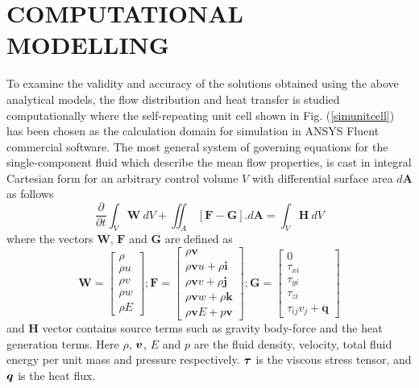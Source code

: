\documentclass[twocolumn,10pt,cleanfoot]{ihmtc}
\begin{document}
\section{COMPUTATIONAL MODELLING}\label{compmodel}
To examine the validity and accuracy of the solutions obtained using the above analytical models, the flow distribution and heat transfer is studied computationally where the self-repeating unit cell shown in Fig. (\ref{simunitcell}) has been chosen as the calculation domain for simulation in ANSYS Fluent commercial software. The most general system of governing equations for the single-component fluid which describe the mean flow properties, is cast in integral Cartesian form for an arbitrary control volume $V$ with differential surface area $d\boldsymbol{A}$ \cite{fluent} as follows
%
\begin{equation*}
\frac{\partial}{\partial t}\int_{V}\boldsymbol{W\:}dV+\iint_{A}\,[\mathbf{F}-\mathbf{G}].d\boldsymbol{A}=\int_{V}\boldsymbol{H\:}dV 
\end{equation*}
%
where the vectors $\boldsymbol{W}$, $\mathbf{F}$ and $\mathbf{G}$ are defined as 
%
\begin{equation*}
 \boldsymbol{W}=\left[\begin{array}{c} \rho\\ \rho u\\ \rho v\\ \rho w\\ \rho E \end{array}\right] ; \boldsymbol{\mathbf{F}}=\left[\begin{array}{c} \rho\boldsymbol{v}\\ \rho\boldsymbol{v}u+\rho\boldsymbol{i}\\ \rho\boldsymbol{v}v+\rho\boldsymbol{j}\\ \rho\boldsymbol{v}w+\rho\boldsymbol{k}\\ \rho\boldsymbol{v}E+p\boldsymbol{v} \end{array}\right] ; \mathbf{G}=\left[\begin{array}{c} 0\\ \tau_{xi}\\ \tau_{yi}\\ \tau_{zi}\\ \tau_{ij}v_{j}+\boldsymbol{q} \end{array}\right]
\end{equation*}
%
and $\boldsymbol{H}$ vector contains source terms such as gravity body-force and the heat generation terms. Here $\rho$, ${\mbox{\boldmath$v$}}$, $E$ and $p$ are the fluid density, velocity, total fluid energy per unit mass and pressure respectively. ${\mbox{\boldmath$\tau$}}$ is the viscous stress tensor, and ${\mbox{\boldmath$q$}}$ is the heat flux. \\
\end{document}

